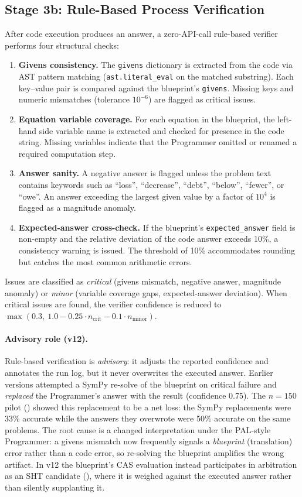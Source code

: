 \documentclass[11pt,a4paper]{article}
\begin{document}
\subsection{Stage 3b: Rule-Based Process Verification}
\label{sec:verification}
After code execution produces an answer, a zero-API-call rule-based verifier performs four structural checks:
\begin{enumerate}[leftmargin=*,itemsep=2pt]
    \item \textbf{Givens consistency.}
    The \texttt{givens} dictionary is extracted from the code via AST pattern matching (\texttt{ast.literal\_eval} on the matched substring).
    Each key--value pair is compared against the blueprint's \texttt{givens}.
    Missing keys and numeric mismatches (tolerance $10^{-6}$) are flagged as critical issues.
    \item \textbf{Equation variable coverage.}
    For each equation in the blueprint, the left-hand side variable name is extracted and checked for presence in the code string.
    Missing variables indicate that the Programmer omitted or renamed a required computation step.
    \item \textbf{Answer sanity.}
    A negative answer is flagged unless the problem text contains keywords such as ``loss'', ``decrease'', ``debt'', ``below'', ``fewer'', or ``owe''.
    An answer exceeding the largest given value by a factor of $10^4$ is flagged as a magnitude anomaly.
    \item \textbf{Expected-answer cross-check.}
    If the blueprint's \texttt{expected\_answer} field is non-empty and the relative deviation of the code answer exceeds 10\%, a consistency warning is issued.
    The threshold of 10\% accommodates rounding but catches the most common arithmetic errors.
\end{enumerate}
Issues are classified as \emph{critical} (givens mismatch, negative answer, magnitude anomaly) or \emph{minor} (variable coverage gaps, expected-answer deviation).
When critical issues are found, the verifier confidence is reduced to $\max(0.3,\ 1.0 - 0.25 \cdot n_{\text{crit}} - 0.1 \cdot n_{\text{minor}})$.
\paragraph{Advisory role (v12).}
Rule-based verification is \emph{advisory}: it adjusts the reported confidence and annotates the run log, but it never overwrites the executed answer.
Earlier versions attempted a SymPy re-solve of the blueprint on critical failure and \emph{replaced} the Programmer's answer with the result (confidence 0.75).
The $n{=}150$ pilot () showed this replacement to be a net loss: the SymPy replacements were 33\% accurate while the answers they overwrote were 50\% accurate on the same problems.
The root cause is a changed interpretation under the PAL-style Programmer: a givens mismatch now frequently signals a \emph{blueprint} (translation) error rather than a code error, so re-solving the blueprint amplifies the wrong artifact.
In v12 the blueprint's CAS evaluation instead participates in arbitration as an SHT candidate (), where it is weighed against the executed answer rather than silently supplanting it.
\end{document}
